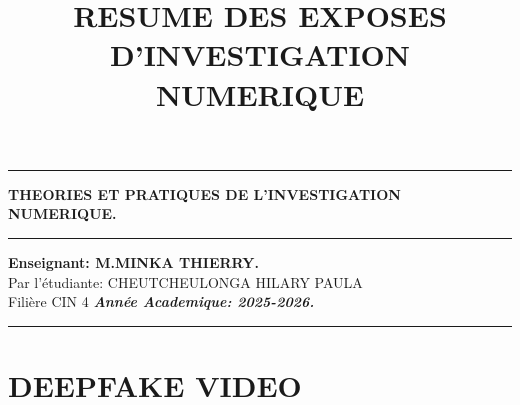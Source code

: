 \documentclass[]{article}
\title{\textbf{RESUME DES EXPOSES D'INVESTIGATION NUMERIQUE}}
\date{}
\begin{document}
\thispagestyle{empty}
\begin{center}
\rule{1\textwidth}{2pt}\vspace{\baselineskip}
\vspace{\baselineskip}\huge\textbf{THEORIES ET PRATIQUES DE L’INVESTIGATION  NUMERIQUE.}
\rule{1\textwidth}{2pt}\vspace{\baselineskip}
\vspace{\baselineskip}
\vfill
\textbf{Enseignant: M.MINKA THIERRY.}\\
\vfill
Par l'étudiante: CHEUTCHEULONGA HILARY PAULA\\
Filière CIN 4\vfill
\vspace{\baselineskip}
\emph{\textbf{Année Academique: 2025-2026.}}
\rule{1\textwidth}{2pt}\vspace{\baselineskip}
\end{center}
\maketitle
\section{DEEPFAKE VIDEO}
\end{document}
